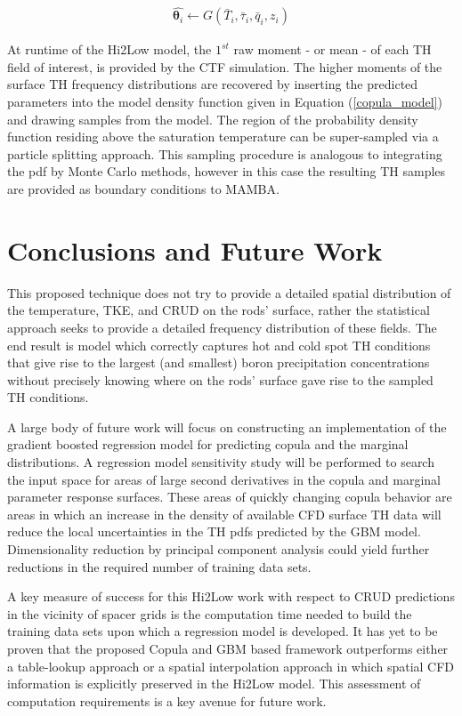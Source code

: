 \documentclass{anstrans}
\begin{document}
\begin{eqnarray}
\hat {\bm \theta_i} \leftarrow G(\bar T_i, \bar \tau_i, \bar q_i, z_i) 
\label{GBM_sample}
\end{eqnarray}

At runtime of the Hi2Low model, the $1^{st}$ raw moment - or mean - of each TH field of interest, is provided by the CTF simulation.  The higher moments of the surface TH frequency distributions  are recovered by inserting the predicted parameters into the model density function given in Equation (\ref{copula_model}) and drawing samples from the model.  The region of the probability density function residing above the saturation temperature can be super-sampled via a particle splitting approach.  This sampling procedure is analogous to integrating the pdf by Monte Carlo methods, however in this case the resulting TH samples are provided as boundary conditions to MAMBA.


\section{Conclusions and Future Work}

This proposed technique does not try to provide a detailed spatial distribution
of the temperature, TKE, and CRUD on the rods' surface, rather the
statistical approach seeks to provide a detailed frequency distribution
of these fields.  The end result is model which correctly captures hot and cold
spot TH conditions that give rise to the largest (and smallest) boron
precipitation concentrations without precisely knowing where on the rods'
surface gave rise to the sampled TH conditions.

A large body of future work will focus on constructing an implementation of the gradient boosted regression model
for predicting copula and the marginal distributions.  A regression model sensitivity study will be performed to search the input space for areas of large second derivatives in the copula and marginal parameter response surfaces.  These areas of quickly changing copula behavior are areas in which an increase in the density of available CFD surface TH data will reduce the local uncertainties in the TH pdfs predicted by the GBM model.  Dimensionality reduction by principal component analysis could yield further reductions in the required number of training data sets. 

A key measure of success for this Hi2Low work with respect to  CRUD predictions
in the vicinity of spacer grids is the computation time needed to build the
training data sets upon which a regression model is developed.
It has yet to be proven that the proposed Copula and GBM based framework outperforms
either a table-lookup approach or a spatial interpolation approach in which
spatial CFD information is explicitly preserved in the Hi2Low model.  This assessment
of computation requirements is a key avenue for future work.
\end{document}
